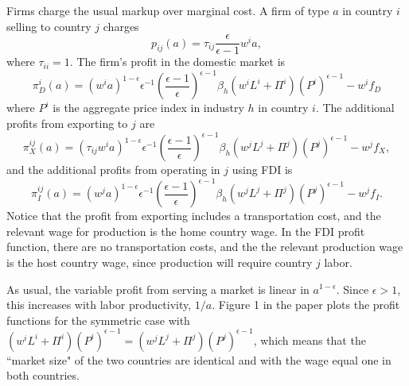 \documentclass[11pt, pdftex]{article}
\begin{document}
Firms charge the usual markup over marginal cost. A firm of type $a$ in country $i$ selling to country $j$ charges
\begin{equation}
    p_{ij}(a) = \tau_{ij}\frac{\epsilon}{\epsilon-1}w^ia,
\end{equation}
where $\tau_{ii}=1$. The firm's profit in the domestic market is
\begin{equation}\label{eq:dprofit}
    \pi^i_D(a) = (w^ia)^{1-\epsilon} \epsilon^{-1} \left(\frac{\epsilon-1}{\epsilon}\right)^{\epsilon-1}\beta_h (w^iL^i+\Pi^i)(P^i)^{\epsilon-1}-w^if_D
\end{equation}
where $P^i$ is the aggregate price index in industry $h$ in country $i$. The additional profits from exporting to $j$ are
\begin{equation}\label{eq:xprofit}
    \pi^{ij}_X(a) = (\tau_{ij}w^ia)^{1-\epsilon} \epsilon^{-1} \left(\frac{\epsilon-1}{\epsilon}\right)^{\epsilon-1}\beta_h (w^jL^j+\Pi^j)(P^j)^{\epsilon-1}-w^jf_X,
\end{equation}
and the additional profits from operating in $j$ using FDI is
\begin{equation}\label{eq:iprofit}
    \pi^{ij}_I(a) = (w^ja)^{1-\epsilon} \epsilon^{-1} \left(\frac{\epsilon-1}{\epsilon}\right)^{\epsilon-1}\beta_h (w^jL^j+\Pi^j)(P^j)^{\epsilon-1}-w^jf_I.
\end{equation}
Notice that the profit from exporting includes a transportation cost, and the relevant wage for production is the home country wage.  In the FDI profit function, there are no transportation costs, and the the relevant production wage is the host country wage, since production will require country $j$ labor.

As usual, the variable profit from serving a market is linear in $a^{1-\epsilon}$.  Since $\epsilon>1$, this increases with labor productivity, $1/a$.  Figure 1 in the paper plots the profit functions for the symmetric case with $(w^iL^i+\Pi^i)(P^i)^{\epsilon-1}=(w^jL^j+\Pi^j)(P^j)^{\epsilon-1}$, which means that the ``market size" of the two countries are identical and with the wage equal one in both countries.
\end{document}
